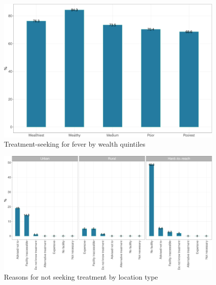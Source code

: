 \documentclass[12pt,a4paper]{article}
\begin{document}
\begin{figure}[H]

{\centering \includegraphics{kayahReport_files/figure-latex/fever2plot-1} 

}

\caption{Treatment-seeking for fever by wealth quintiles}\label{fig:fever2plot}
\end{figure}

\begin{figure}[H]

{\centering \includegraphics{kayahReport_files/figure-latex/fever4plot-1} 

}

\caption{Reasons for not seeking treatment by location type}\label{fig:fever4plot}
\end{figure}
\end{document}
